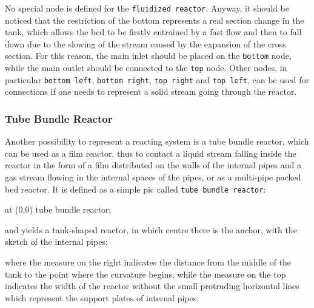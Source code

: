 \documentclass[12pt]{article}						%
\newcommand*{\chpn}[1]{\texttt{#1}}				%
\newcommand*{\chpp}[1]{\texttt{#1}}				%
\begin{document}
No special node is defined for the \chpp{fluidized reactor}. Anyway, it should
be noticed that the restriction of the bottom represents a real section
change in the tank, which allows the bed to be firstly entrained by a fast
flow and then to fall down due to the slowing of the stream caused by the
expansion of the cross section. For this reason, the main inlet should be placed
on the \chpn{bottom} node, while the main outlet should be connected to the
\chpn{top} node. Other nodes, in particular \chpn{bottom left},
\chpn{bottom right}, \chpn{top right} and \chpn{top left}, can be used for
connections if one needs to represent a solid stream going through the reactor.

\subsubsection{Tube Bundle Reactor}

Another possibility to represent a reacting system is a tube bundle reactor,
which can be used as a film reactor, thus to contact a liquid stream falling
inside the reactor in the form of a film distributed on the walls of the internal
pipes and a gas stream flowing in the internal spaces of the pipes, or as a
multi-pipe packed bed reactor. It is defined as a simple pic called
\chpp{tube bundle reactor}:
\begin{chpcode}
	\pic at (0,0) {tube bundle reactor};
\end{chpcode}
and yields a tank-shaped reactor, in which centre there is the anchor, with the
sketch of the internal pipes:
\begin{center}
\end{center}
where the measure on the right indicates the distance from the middle of the tank
to the point where the curvature begins, while the measure on the top indicates
the width of the reactor without the small protruding horizontal lines which
represent the support plates of internal pipes.
\end{document}
